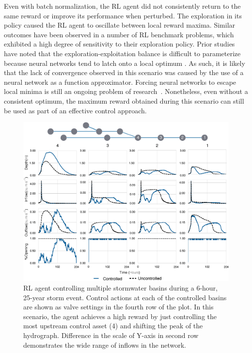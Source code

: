 Even with batch normalization, the RL agent did not consistently return to the same reward or improve its performance when perturbed.
The exploration in its policy caused the RL agent to oscillate between local reward maxima.
Similar outcomes have been observed in a number of RL benchmark problems\cite{henderson2017Deep, Mnih2015}, which exhibited a high degree of sensitivity to their exploration policy.
Prior studies have noted that the exploration-exploitation balance is difficult to parameterize because neural networks tend to latch onto a local optimum \cite{larochelle2009exploring}.
As such, it is likely that the lack of convergence observed in this scenario was caused by the use of a neural network as a function approximator.
Forcing neural networks to escape local minima is still an ongoing problem of research~\cite{osband2016Deep}.
Nonetheless, even without a consistent optimum, the maximum reward obtained during this scenario can still be used as part of an effective control approach.


\begin{figure}
    \centering
        \includegraphics[width=\textwidth]{gfx/Chapter-3/system_scale_1.eps}
    \caption{RL agent controlling multiple stormwater basins during a 6-hour, 25-year storm event. Control actions at each of the controlled basins are shown as valve settings in the fourth row of the plot. In this scenario, the agent achieves a high reward by just controlling the most upstream control asset (4) and shifting the peak of the hydrograph. Difference in the scale of Y-axis in second row demonstrates the wide range of inflows in the network.}\label{fig:ch3-fig5}
\end{figure}


